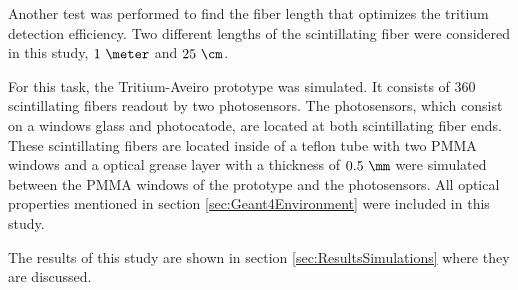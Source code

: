 Another test was performed to find the fiber length that optimizes the tritium detection efficiency. Two different lengths of the scintillating fiber were considered in this study, $1~\meter$ and $25~\cm$. 

For this task, the Tritium-Aveiro prototype was simulated. It consists of $360$ scintillating fibers readout by two photosensors. The photosensors, which consist on a windows glass and photocatode, are located at both scintillating fiber ends. These scintillating fibers are located inside of a teflon tube with two PMMA windows and a optical grease layer with a thickness of $0.5~\mm$ were simulated between the PMMA windows of the prototype and the photosensors. All optical properties mentioned in section \ref{sec:Geant4Environment} were included in this study.

The results of this study are shown in section \ref{sec:ResultsSimulations} where they are discussed.